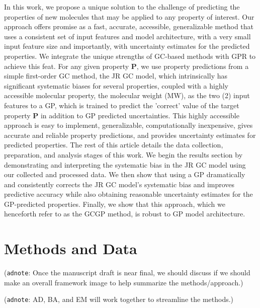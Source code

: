 \documentclass[journal=jacsat,manuscript=article]{achemso}
\newcommand{\alltodo}[1]{{\color{Cyan} (\texttt{alltodo}: #1)}}
\newcommand{\adnote}[1]{{\color{OliveGreen} (\texttt{adnote}: #1)}}
\begin{document}
In this work, we propose a unique solution to the challenge of predicting the properties of new molecules that may be applied to any property of interest. Our approach offers promise as a fast, accurate, accessible, generalizable method that uses a consistent set of input features and model architecture, with a very small input feature size and importantly, with uncertainty estimates for the predicted properties.
We integrate the unique strengths of GC-based methods with GPR to achieve this feat. For any given property \textbf{P}, we use property predictions from a simple first-order GC method, the JR GC model, which intrinsically has significant systematic biases for several properties, coupled with a highly accessible molecular property, the molecular weight (MW), as the two (2) input features to a GP, which is trained to predict the 'correct' value of the target property \textbf{P} in addition to GP predicted uncertainties.
This highly accessible approach is easy to implement, generalizable, computationally inexpensive, gives accurate and reliable property predictions, and provides uncertainty estimates for predicted properties.
The rest of this article details the data collection, preparation, and analysis stages of this work. We begin the results section by demonstrating and interpreting the systematic bias in the JR GC model using our collected and processed data. We then show that using a GP dramatically and consistently corrects the JR GC model's systematic bias and improves predictive accuracy while also obtaining reasonable uncertainty estimates for the GP-predicted properties. Finally, we show that this approach, which we henceforth refer to as the GCGP method, is robust to GP model architecture.

\section{Methods and Data}

\adnote{Once the manuscript draft is near final, we should discuss if we should make an overall framework image to help summarize the methods/approach.}

\adnote{AD, BA, and EM will work together to streamline the methods.}

\end{document}
